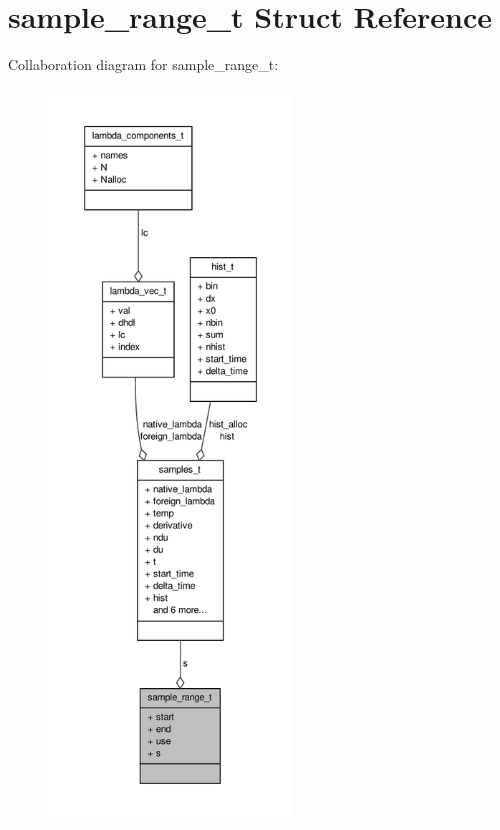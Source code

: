 \hypertarget{structsample__range__t}{\section{sample\-\_\-range\-\_\-t \-Struct \-Reference}
\label{structsample__range__t}
}


\-Collaboration diagram for sample\-\_\-range\-\_\-t\-:
\nopagebreak
\begin{figure}[H]
\begin{center}
\leavevmode
\includegraphics[height=550pt]{structsample__range__t__coll__graph}
\end{center}
\end{figure}
